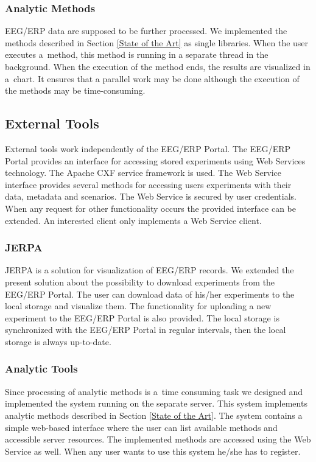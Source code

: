 \documentclass[a4paper,twoside]{article}
\begin{document}
\subsubsection{Analytic Methods}

EEG/ERP data are supposed to be further processed. We implemented the methods described in Section \ref{State of the Art} as single libraries. When the user executes a~method, this method is running in a separate thread in the background. When the execution of the method ends, the results are visualized in a~chart. It ensures that a parallel work may be done although the execution of the methods may be time-consuming.

\subsection{External Tools}

 External tools work independently of the EEG/ERP Portal. The EEG/ERP Portal provides an interface for accessing stored experiments using Web Services technology. The Apache CXF service framework is used. The Web Service interface provides several methods for accessing users experiments with their data, metadata and scenarios. The Web Service is secured by user credentials. When any request for other functionality occurs the provided interface can be extended. An interested client only implements a Web Service client.

\subsubsection{JERPA}

JERPA \cite{DBLP:conf/biostec/JezekM11} is a solution for visualization of EEG/ERP records. We extended the present solution about the possibility to download experiments from the EEG/ERP Portal. The user can download data of his/her experiments to the local storage and visualize them. The functionality for uploading a new experiment to the EEG/ERP Portal is also provided. The local storage is synchronized with the EEG/ERP Portal in regular intervals, then the local storage is always up-to-date.

\subsubsection{Analytic Tools}

Since processing of analytic methods is a~time consuming task we designed and implemented the system running on the separate server. This system implements analytic methods described in Section \ref{State of the Art}. The system contains a simple web-based interface where the user can list available methods and accessible server resources. The implemented methods are accessed using the Web Service as well. When any user wants to use this system he/she has to register.
\end{document}
